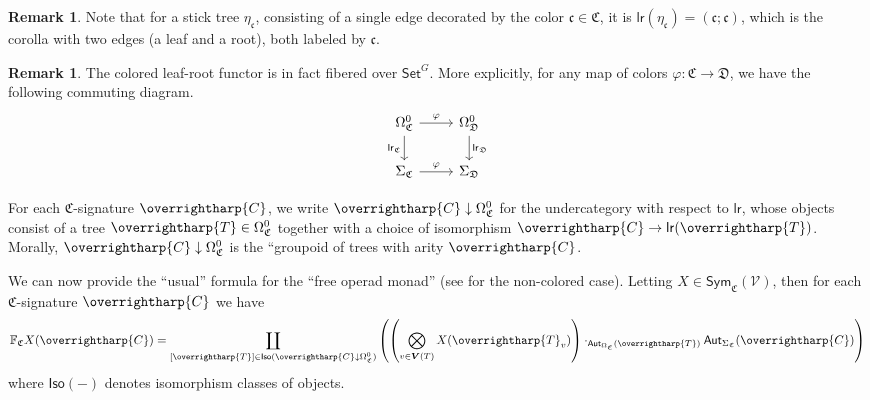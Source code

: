 \documentclass[a4paper,10pt
,draft
]{article}%
\numberwithin{equation}{section}
\numberwithin{figure}{section}
\theoremstyle{definition} %
\newtheorem{remark}[equation]{Remark}%
\newcommand{\vect}[1]{\text{\overrightharp{\ensuremath{#1}}}}
\newcommand{\V}{\ensuremath{\mathcal V}}
\newcommand{\1}{\ensuremath{\mathbbm 1}}%
\begin{document}
\begin{remark}\label{ETACNOT REM}
	Note that for a stick tree $\eta_{\mathfrak{c}}$,
	consisting of a single edge decorated by the color 
	$\mathfrak{c} \in \mathfrak{C}$,
	it is 
	$\mathsf{lr}(\eta_{\mathfrak{c}}) = (\mathfrak{c};\mathfrak{c})$,
	which is the corolla with two edges (a leaf and a root),
	both labeled by $\mathfrak{c}$.
\end{remark}

\begin{remark}
	The colored leaf-root functor is in fact fibered over $\mathsf{Set}^G$.
	More explicitly, for any map of colors 
	$\varphi \colon \mathfrak C \to \mathfrak D$,
	we have the following commuting diagram.
	\begin{equation}
	\label{COLORLR_EQ}
	\begin{tikzcd}
	\Omega_{\mathfrak C}^0 \arrow[r, "\varphi"] \arrow[d, "\mathsf{lr}_{\mathfrak C}"']
	&
	\Omega_{\mathfrak D}^0 \arrow[d, "\mathsf{lr}_{\mathfrak D}"]
	\\
	\Sigma_{\mathfrak C} \arrow[r, "\varphi"]
	&
	\Sigma_{\mathfrak D}
	\end{tikzcd}
	\end{equation}
\end{remark}

For each $\mathfrak{C}$-signature $\vect{C}$,
we write $\vect{C} \downarrow \Omega_{\mathfrak{C}}^0$
for the undercategory with respect to $\mathsf{lr}$, 
whose objects consist of a tree $\vect{T}\in \Omega_{\mathfrak{C}}^0$
together with a choice of isomorphism 
$\vect{C} \to \mathsf{lr}(\vect{T})$.
Morally, $\vect{C} \downarrow \Omega_{\mathfrak{C}}^0$
is the ``groupoid of trees with arity $\vect{C}$. 

We can now provide the ``usual'' formula for the ``free operad monad''
(see \cite[page 816]{BM07} for the non-colored case).
Letting $X \in \mathsf{Sym}_{\mathfrak{C}}(\V)$,
then for each $\mathfrak{C}$-signature $\vect{C}$ we have
\begin{equation}\label{FROPEXP EQ}
\mathbb{F}_{\mathfrak{C}} X (\vect{C})
=
\coprod_{[\vect{T}] \in 
	\mathsf{Iso}(\vect{C} \downarrow \Omega^0_{\mathfrak{C}})}
\left(
\left(
\bigotimes_{v \in \boldsymbol{V}(T)} X(\vect{T}_v)
\right)
\cdot_{\mathsf{Aut}_{\Omega_{\mathfrak{C}}}(\vect{T})}
\mathsf{Aut}_{\Sigma_{\mathfrak{C}}}(\vect{C})
\right)
\end{equation}
where $\mathsf{Iso}(-)$ denotes isomorphism classes of objects.
\end{document}
